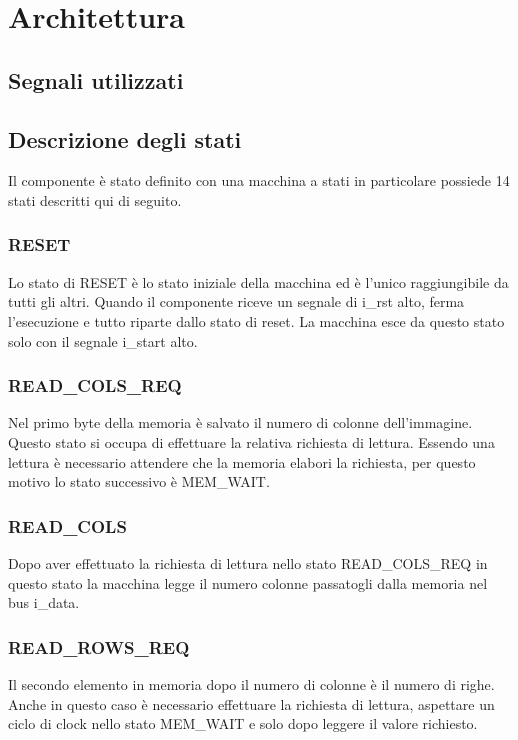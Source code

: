 \documentclass{article}
\begin{document}
\section{Architettura}

\subsection{Segnali utilizzati}

\pagebreak
\subsection{Descrizione degli stati}
Il componente è stato definito con una macchina a stati in particolare possiede 14 stati descritti qui di seguito.

\subsubsection{RESET}
Lo stato di RESET è lo stato iniziale della macchina ed è l'unico raggiungibile da tutti gli altri. Quando il componente riceve un segnale di i\_rst alto, ferma l'esecuzione e tutto riparte dallo stato di reset. La macchina esce da questo stato solo con il segnale i\_start alto.

\subsubsection{READ\_COLS\_REQ}
Nel primo byte della memoria è salvato il numero di colonne dell'immagine. Questo stato si occupa di effettuare la relativa richiesta di lettura. Essendo una lettura è necessario attendere che la memoria elabori la richiesta, per questo motivo lo stato successivo è MEM\_WAIT.

\subsubsection{READ\_COLS}
Dopo aver effettuato la richiesta di lettura nello stato READ\_COLS\_REQ in questo stato la macchina legge il numero colonne passatogli dalla memoria nel bus i\_data.

\subsubsection{READ\_ROWS\_REQ}
Il secondo elemento in memoria dopo il numero di colonne è il numero di righe. Anche in questo caso è necessario effettuare la richiesta di lettura, aspettare un ciclo di clock nello stato MEM\_WAIT e solo dopo leggere il valore richiesto.
\end{document}
